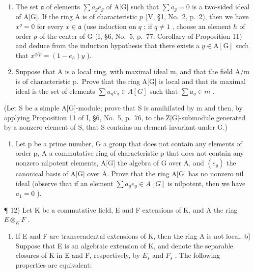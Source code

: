 \begin{enumerate}
\def\labelenumi{\alph{enumi})}
\item
  The set \(\mathfrak{a}\) of elements \(\sum a_{g}e_{g}\) of A{[}G{]} such that \(\sum a_{g} = 0\) is a two-sided ideal of A{[}G{]}. If the ring A is of characteristic \(p\) (V, §1, No.~2, p.~2), then we have \(x^{q} = 0\) for every \(x\in \mathfrak{a}\) (use induction on \(q\) ; if \(q\neq 1\) , choose an element \(h\) of order \(p\) of the center of G (I, §6, No.~5, p.~77, Corollary of Proposition 11) and deduce from the induction hypothesis that there exists a \(y\in \mathrm{A}[\mathrm{G}]\) such that \(x^{q / p} = (1 - e_h)y\) ).
\item
  Suppose that A is a local ring, with maximal ideal m, and that the field A/m is of characteristic p.~Prove that the ring A{[}G{]} is local and that its maximal ideal is the set of elements \(\sum a_{g}e_{g}\in A[G]\) such that \(\sum a_{g}\in m\) .
\end{enumerate}

(Let S be a simple A{[}G{]}-module; prove that S is annihilated by m and then, by applying Proposition 11 of I, §6, No.~5, p.~76, to the Z{[}G{]}-submodule generated by a nonzero element of S, that S contains an element invariant under G.)

\begin{enumerate}
\def\labelenumi{\arabic{enumi})}
\setcounter{enumi}{10}
\tightlist
\item
  Let p be a prime number, G a group that does not contain any elements of order p, A a commutative ring of characteristic p that does not contain any nonzero nilpotent elements, A{[}G{]} the algebra of G over A, and \((e_{g})\) the canonical basis of A{[}G{]} over A. Prove that the ring A{[}G{]} has no nonzero nil ideal (observe that if an element \(\sum a_{g}e_{g} \in A[G]\) is nilpotent, then we have \(a_{1} = 0\) ).
\end{enumerate}

¶ 12) Let K be a commutative field, E and F extensions of K, and A the ring \(E \otimes_{K} F\) .

\begin{enumerate}
\def\labelenumi{\alph{enumi})}
\tightlist
\item
  If E and F are transcendental extensions of K, then the ring A is not local. b) Suppose that E is an algebraic extension of K, and denote the separable closures of K in E and F, respectively, by \(E_{s}\) and \(F_{s}\) . The following properties are equivalent:
\end{enumerate}

